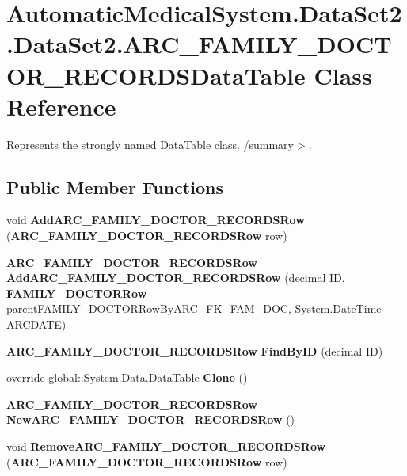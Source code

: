 \section{AutomaticMedicalSystem.DataSet2.DataSet2.ARC\_\-FAMILY\_\-DOCTOR\_\-RECORDSDataTable Class Reference}
\label{class_automatic_medical_system_1_1_data_set2_1_1_a_r_c___f_a_m_i_l_y___d_o_c_t_o_r___r_e_c_o_r_d_s_data_table}
Represents the strongly named DataTable class. /summary$>$.  


\subsection*{Public Member Functions}
\begin{CompactItemize}
\item 
void \textbf{AddARC\_\-FAMILY\_\-DOCTOR\_\-RECORDSRow} ({\bf ARC\_\-FAMILY\_\-DOCTOR\_\-RECORDSRow} row)\label{class_automatic_medical_system_1_1_data_set2_1_1_a_r_c___f_a_m_i_l_y___d_o_c_t_o_r___r_e_c_o_r_d_s_data_table_4fab340a60a025d34875f849297e95bd}

\item 
{\bf ARC\_\-FAMILY\_\-DOCTOR\_\-RECORDSRow} \textbf{AddARC\_\-FAMILY\_\-DOCTOR\_\-RECORDSRow} (decimal ID, {\bf FAMILY\_\-DOCTORRow} parentFAMILY\_\-DOCTORRowByARC\_\-FK\_\-FAM\_\-DOC, System.DateTime ARCDATE)\label{class_automatic_medical_system_1_1_data_set2_1_1_a_r_c___f_a_m_i_l_y___d_o_c_t_o_r___r_e_c_o_r_d_s_data_table_9d5e764ac12702392f865dfb29e31dcd}

\item 
{\bf ARC\_\-FAMILY\_\-DOCTOR\_\-RECORDSRow} \textbf{FindByID} (decimal ID)\label{class_automatic_medical_system_1_1_data_set2_1_1_a_r_c___f_a_m_i_l_y___d_o_c_t_o_r___r_e_c_o_r_d_s_data_table_0848ed535deeccb94c56e13682eea8fe}

\item 
override global::System.Data.DataTable \textbf{Clone} ()\label{class_automatic_medical_system_1_1_data_set2_1_1_a_r_c___f_a_m_i_l_y___d_o_c_t_o_r___r_e_c_o_r_d_s_data_table_05afe8585cb22e5537bbad21ea5d88c7}

\item 
{\bf ARC\_\-FAMILY\_\-DOCTOR\_\-RECORDSRow} \textbf{NewARC\_\-FAMILY\_\-DOCTOR\_\-RECORDSRow} ()\label{class_automatic_medical_system_1_1_data_set2_1_1_a_r_c___f_a_m_i_l_y___d_o_c_t_o_r___r_e_c_o_r_d_s_data_table_5baf6722a4c3cd3b9d88c52b721c7d67}

\item 
void \textbf{RemoveARC\_\-FAMILY\_\-DOCTOR\_\-RECORDSRow} ({\bf ARC\_\-FAMILY\_\-DOCTOR\_\-RECORDSRow} row)\label{class_automatic_medical_system_1_1_data_set2_1_1_a_r_c___f_a_m_i_l_y___d_o_c_t_o_r___r_e_c_o_r_d_s_data_table_340782759eef30eda3880007b3c3b38f}

\end{CompactItemize}
